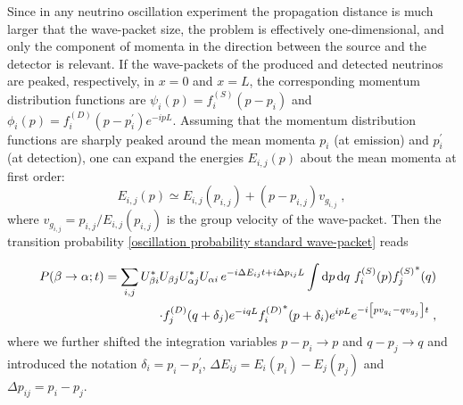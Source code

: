 \documentclass[11pt]{article}
\newcommand{\inttt}[1]{\int\dd{#1}}
\begin{document}
 Since in any neutrino oscillation experiment the propagation distance is much larger that the wave-packet size, the problem is effectively one-dimensional, and only the component of momenta in the direction between the source and the detector is relevant. If the wave-packets of the produced and detected neutrinos are peaked, respectively, in $x=0$ and $x=L$, the corresponding momentum distribution functions are $\psi_i(p)=f_i^{(S)}(p-p_i)$ and $\phi_i(p) = f_i^{(D)}(p-p^\prime_i)e^{-ipL}$. Assuming that the momentum distribution functions are sharply peaked around the mean momenta $p_i$ (at emission) and $p_i^\prime$ (at detection), one can expand the energies $E_{i,j}(p)$ about the mean momenta at first order:
\begin{equation}
    E_{i,j}(p)
    \simeq E_{i,j}(p_{i,j}) + (p-p_{i,j})v_{g_{i,j}}\;,
\end{equation}
where $v_{g_{i,j}}=p_{i,j}/E_{i,j}(p_{i,j})$ is the group velocity of the wave-packet. Then the transition probability \eqref{oscillation probability standard wave-packet} reads

\begin{eqnarray}
    &&P(\beta\to\alpha;t) = \sum_{i,j} U^*_{\beta i} U_{\beta j} U^*_{\alpha j} U_{\alpha i} \,e^{-i\Delta E_{ij}t+i\Delta p_{ij}L} \inttt{p}\dd{q}\,f_i^{(S)}(p){f_j^{(S)}}^*(q) \nonumber \\ &&\cdot f_j^{(D)}(q+\delta_j) e^{-iq L} {f_i^{(D)}}^*(p+\delta_i) e^{ipL} e^{-i\qty[pv_{g_i}-qv_{g_j}]t}\;,\label{prob}
\end{eqnarray}
where we further shifted the integration variables $p-p_i \to p$ and $q-p_j \to q$ and introduced the notation $\delta_i = p_i-p_i^\prime$, $\Delta E_{ij} = E_i(p_i)-E_j(p_j)$ and $\Delta p_{ij} = p_i-p_j$.
\end{document}
